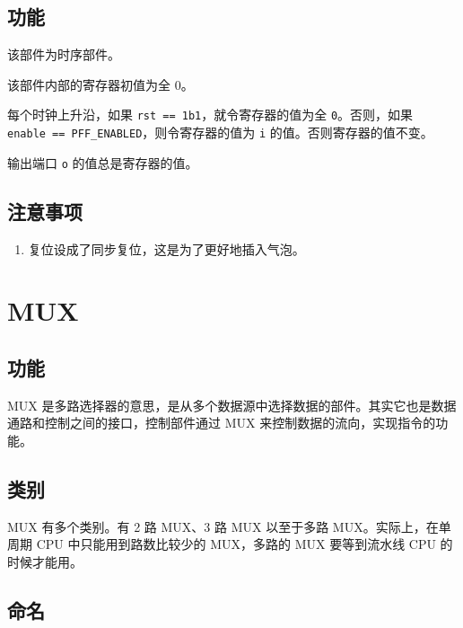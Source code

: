 \documentclass[12pt,AutoFakeBold,AutoFakeSlant]{article}
\providecommand{\tightlist}{%
  \setlength{\itemsep}{0pt}\setlength{\parskip}{0pt}}
\begin{document}
\hypertarget{ux529fux80fd-10}{%
\subsection{功能}\label{ux529fux80fd-10}}

该部件为时序部件。

该部件内部的寄存器初值为全 0。

每个时钟上升沿，如果
\texttt{rst\ ==\ 1\textquotesingle{}b1}，就令寄存器的值为全
\texttt{0}。否则，如果
\texttt{enable\ ==\ PFF\_ENABLED}，则令寄存器的值为 \texttt{i}
的值。否则寄存器的值不变。

输出端口 \texttt{o} 的值总是寄存器的值。

\hypertarget{ux6ce8ux610fux4e8bux9879-6}{%
\subsection{注意事项}\label{ux6ce8ux610fux4e8bux9879-6}}

\begin{enumerate}
\def\labelenumi{\arabic{enumi}.}
\tightlist
\item
  复位设成了同步复位，这是为了更好地插入气泡。
\end{enumerate}

\hypertarget{mux}{%
\section{MUX}\label{mux}}

\hypertarget{ux529fux80fd-11}{%
\subsection{功能}\label{ux529fux80fd-11}}

MUX
是多路选择器的意思，是从多个数据源中选择数据的部件。其实它也是数据通路和控制之间的接口，控制部件通过
MUX 来控制数据的流向，实现指令的功能。

\hypertarget{ux7c7bux522b}{%
\subsection{类别}\label{ux7c7bux522b}}

MUX 有多个类别。有 2 路 MUX、3 路 MUX 以至于多路 MUX。实际上，在单周期
CPU 中只能用到路数比较少的 MUX，多路的 MUX 要等到流水线 CPU
的时候才能用。

\hypertarget{ux547dux540d}{%
\subsection{命名}\label{ux547dux540d}}
\end{document}
